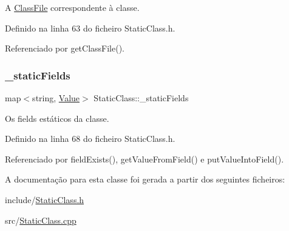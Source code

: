 A {\ttfamily \hyperlink{classClassFile}{Class\+File}} correspondente à classe. 

Definido na linha 63 do ficheiro Static\+Class.\+h.



Referenciado por get\+Class\+File().

\mbox{\label{classStaticClass_a3f328810c97cb2b6e15830e3c1cd6289}} 
\subsubsection{\texorpdfstring{\+\_\+static\+Fields}{\_staticFields}}
{\footnotesize\ttfamily map$<$string, \hyperlink{structValue}{Value}$>$ Static\+Class\+::\+\_\+static\+Fields\hspace{0.3cm}{\ttfamily [private]}}

Os fields estáticos da classe. 

Definido na linha 68 do ficheiro Static\+Class.\+h.



Referenciado por field\+Exists(), get\+Value\+From\+Field() e put\+Value\+Into\+Field().



A documentação para esta classe foi gerada a partir dos seguintes ficheiros\+:\begin{DoxyCompactItemize}
\item 
include/\hyperlink{StaticClass_8h}{Static\+Class.\+h}\item 
src/\hyperlink{StaticClass_8cpp}{Static\+Class.\+cpp}\end{DoxyCompactItemize}
